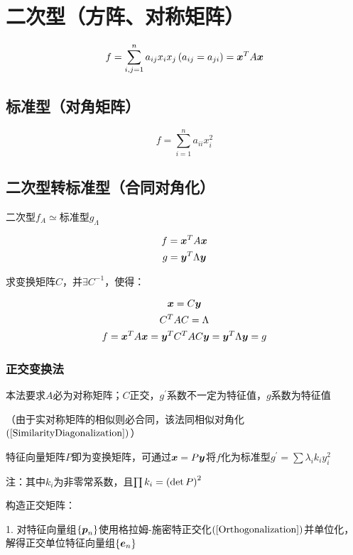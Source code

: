 \documentclass{article}
\begin{document}
\section{二次型（方阵、对称矩阵）}

\begin{definition}
    \[f=\sum_{i,j=1}^na_{ij}x_ix_j\left(a_{ij}=a_{ji}\right)
        =\boldsymbol x^TA\boldsymbol x\]
\end{definition}

\subsection{标准型（对角矩阵）}

\[f=\sum_{i=1}^na_{ii}x_i^2\]

\subsection{二次型转标准型（合同对角化）}

二次型$f_A\simeq$标准型$g_\Lambda$

\[\begin{gathered}
        f=\boldsymbol x^TA\boldsymbol x\\
        g=\boldsymbol y^T\Lambda\boldsymbol y
    \end{gathered}\]

求变换矩阵$C$，并$\exists C^{-1}$，使得：

\[\begin{gathered}
        \boldsymbol x=C\boldsymbol y\\
        C^TAC=\Lambda\\
        f=\boldsymbol x^TA\boldsymbol x=\boldsymbol y^TC^TAC\boldsymbol y=\boldsymbol y^T\Lambda\boldsymbol y=g
    \end{gathered}\]

\subsubsection{正交变换法}

本法要求$A$必为对称矩阵；$C$正交，$g^\prime$系数不一定为特征值，$g$系数为特征值

（由于实对称矩阵的相似则必合同，该法同相似对角化$\left(\ref{SimilarityDiagonalization}\right)$）

特征向量矩阵$P$即为变换矩阵，可通过$\boldsymbol x=P\boldsymbol y$将$f$化为标准型$g^\prime=\sum\lambda_ik_iy_i^2$

注：其中$k_i$为非零常系数，且$\prod k_i=\left(\det P\right)^2$

构造正交矩阵：

1. 对特征向量组$\left\{\boldsymbol p_n\right\}$使用格拉姆-施密特正交化$\left(\ref{Orthogonalization}\right)$并单位化，解得正交单位特征向量组$\left\{\boldsymbol e_n\right\}$
\end{document}
